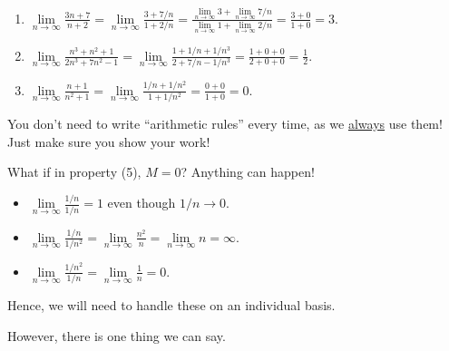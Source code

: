 \begin{Example}{}{}
    \begin{enumerate}[(1)]
        \item $ \displaystyle \lim\limits_{{n} \to {\infty}}\frac{3n+7}{n+2}
                  =\lim\limits_{{n} \to {\infty}}\frac{3+7/n}{1+2/n}
                  =\frac{\lim\limits_{{n} \to {\infty}}3+\lim\limits_{{n} \to {\infty}}7/n}{\lim\limits_{{n} \to {\infty}}1+\lim\limits_{{n} \to {\infty}}2/n}
                  =\frac{3+0}{1+0}
                  =3 $.
        \item $ \displaystyle
                  \lim\limits_{{n} \to {\infty}}\frac{n^3+n^2+1}{2n^3+7n^2-1}
                  =\lim\limits_{{n} \to {\infty}}\frac{1+1/n+1/n^3}{2+7/n-1/n^3}
                  =\frac{1+0+0}{2+0+0}
                  =\frac{1}{2} $.
        \item $ \displaystyle
                  \lim\limits_{{n} \to {\infty}}\frac{n+1}{n^2+1}
                  =\lim\limits_{{n} \to {\infty}}\frac{1/n+1/n^2}{1+1/n^2}
                  =\frac{0+0}{1+0}
                  =0 $.
    \end{enumerate}
\end{Example}
\begin{Remark}{}{}
    You don't need to write ``arithmetic rules''
    every time, as we \underline{always} use them!
    Just make sure you show your work!
\end{Remark}
\begin{Example}{}{}
    What if in property (5), $ M=0 $? Anything can happen!
    \begin{itemize}
        \item $ \displaystyle \lim\limits_{{n} \to {\infty}}\frac{1/n}{1/n}=1 $
              even though $ 1/n\to 0 $.
        \item $ \displaystyle \lim\limits_{{n} \to {\infty}}\frac{1/n}{1/n^2}=
                  \lim\limits_{{n} \to {\infty}}\frac{n^2}{n}=
                  \lim\limits_{{n} \to {\infty}}n=\infty $.
        \item $ \displaystyle \lim\limits_{{n} \to {\infty}}\frac{1/n^2}{1/n}=
                  \lim\limits_{{n} \to {\infty}}\frac{1}{n}=0 $.
    \end{itemize}
    Hence, we will need to handle these on an individual basis.
\end{Example}
However, there is one thing we can say.

